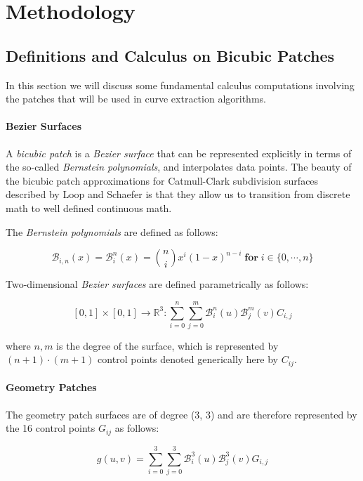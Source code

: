 \documentclass[12pt, letterpaper]{article}
\begin{document}
\newpage

\section{Methodology}

	\subsection{Definitions and Calculus on Bicubic Patches}
	
	In this section we will discuss some fundamental calculus computations involving the patches that will be used in curve extraction algorithms.

		\paragraph{Bezier Surfaces}
		A \emph{bicubic patch} is a \emph{Bezier surface} that can be represented explicitly in terms of the so-called
		\emph{Bernstein polynomials}, and interpolates data points.
		The beauty of the bicubic patch approximations for Catmull-Clark subdivision surfaces described by Loop and Schaefer
		is that they allow us to transition from discrete math to well defined continuous math.

		The \emph{Bernstein polynomials} are defined as follows:

		$$\mathcal{B}_{i, n}(x) = \mathcal{B}_{i}^{n}(x) = \binom{n}{i}x^{i}(1-x)^{n-i} \; \textbf{for} \; i \in \{0, \cdots, n\}  $$
		
		Two-dimensional \emph{Bezier surfaces} are defined parametrically as follows: 
		
		$$[0, 1] \times [0, 1] \rightarrow \mathbb{R}^{3} : \sum_{i=0}^{n}{\sum_{j=0}^{m}{\mathcal{B}_{i}^{n}(u) \mathcal{B}_{j}^{m}(v) C_{i, j}}}$$
		
		where $n, m$ is the degree of the surface, which is represented by $(n + 1) \cdot (m + 1)$ control points denoted generically here by $C_{ij}$.
		
		\paragraph{Geometry Patches}

		The geometry patch surfaces are of degree (3, 3) and are therefore represented by the 16 control points $G_{ij}$ as follows:
		
		$$g(u, v) = \sum_{i=0}^{3}{\sum_{j=0}^{3}{\mathcal{B}_{i}^{3}(u) \mathcal{B}_{j}^{3}(v) G_{i, j}}}$$
		
\end{document}
